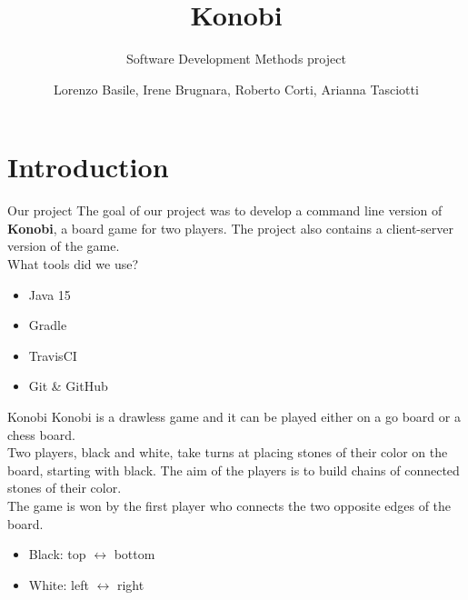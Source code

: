 \documentclass{beamer}
\title{\huge Konobi}
\date{}
\subtitle{Software Development Methods project}
\author{Lorenzo Basile, Irene Brugnara, Roberto Corti, Arianna Tasciotti}
\begin{document}
  \maketitle
  \section{Introduction}
  \begin{frame}{Our project}
    The goal of our project was to develop a command line version of \textbf{Konobi}, a board game for two players. The project also contains a client-server version of the game.
    \vspace{0.7cm}
    \pause
    \\What tools did we use?
    \begin{itemize}
    \item Java 15
    \item Gradle
    \item TravisCI
    \item Git \& GitHub
    \end{itemize}
    \end{frame}
  \begin{frame}{Konobi}
    Konobi is a drawless game and it can be played either on a go board or a chess board.
    \\Two players, black and white, take turns at placing stones of their color on the board, starting with black. The aim of the players is to build chains of connected stones of their color.
    \vspace{0.5cm}
    \pause
    \\The game is won by the first player who connects the two opposite edges of the board.
    \begin{itemize}
    \item Black: top $\leftrightarrow$ bottom
    \item White: left $\leftrightarrow$ right
    \end{itemize}
      \end{frame}
      
\end{document}
